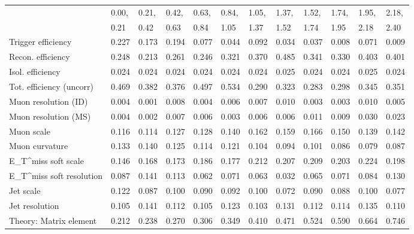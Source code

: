 \begin{tabular}{l|p{0.6cm}p{0.6cm}p{0.6cm}p{0.6cm}p{0.6cm}p{0.6cm}p{0.6cm}p{0.6cm}p{0.6cm}p{0.6cm}p{0.6cm}}
\hline
   & 0.00, & 0.21, & 0.42, & 0.63, & 0.84, & 1.05, & 1.37, & 1.52, & 1.74, & 1.95, & 2.18,  \\ 
   & 0.21 & 0.42 & 0.63 & 0.84 & 1.05 & 1.37 & 1.52 & 1.74 & 1.95 & 2.18 & 2.40  \\ 
\hline
Trigger efficiency                       & 0.227 & 0.173 & 0.194 & 0.077 & 0.044 & 0.092 & 0.034 & 0.037 & 0.008 & 0.071 & 0.009 \\
Recon. efficiency                        & 0.248 & 0.213 & 0.261 & 0.246 & 0.321 & 0.370 & 0.485 & 0.341 & 0.330 & 0.403 & 0.401 \\
Isol. efficiency                         & 0.024 & 0.024 & 0.024 & 0.024 & 0.024 & 0.024 & 0.025 & 0.024 & 0.024 & 0.025 & 0.024 \\
Tot. efficiency (uncorr)                 & 0.469 & 0.382 & 0.376 & 0.497 & 0.534 & 0.290 & 0.323 & 0.283 & 0.298 & 0.345 & 0.351 \\
Muon resolution (ID)                     & 0.004 & 0.001 & 0.008 & 0.004 & 0.006 & 0.007 & 0.010 & 0.003 & 0.003 & 0.010 & 0.005 \\
Muon resolution (MS)                     & 0.004 & 0.002 & 0.007 & 0.006 & 0.003 & 0.006 & 0.006 & 0.011 & 0.009 & 0.030 & 0.023 \\
Muon scale                               & 0.116 & 0.114 & 0.127 & 0.128 & 0.140 & 0.162 & 0.159 & 0.166 & 0.150 & 0.139 & 0.142 \\
Muon curvature                           & 0.133 & 0.140 & 0.125 & 0.114 & 0.121 & 0.104 & 0.094 & 0.101 & 0.086 & 0.079 & 0.087 \\
E_{T}^{miss} soft scale                  & 0.146 & 0.168 & 0.173 & 0.186 & 0.177 & 0.212 & 0.207 & 0.209 & 0.203 & 0.224 & 0.198 \\
E_{T}^{miss} soft resolution             & 0.087 & 0.141 & 0.113 & 0.062 & 0.071 & 0.063 & 0.032 & 0.065 & 0.071 & 0.084 & 0.130 \\
Jet scale                                & 0.122 & 0.087 & 0.100 & 0.090 & 0.092 & 0.100 & 0.072 & 0.090 & 0.088 & 0.100 & 0.077 \\
Jet resolution                           & 0.105 & 0.141 & 0.112 & 0.105 & 0.123 & 0.103 & 0.131 & 0.112 & 0.114 & 0.135 & 0.110 \\
Theory: Matrix element                   & 0.212 & 0.238 & 0.270 & 0.306 & 0.349 & 0.410 & 0.471 & 0.524 & 0.590 & 0.664 & 0.746 \\

\end{tabular}
